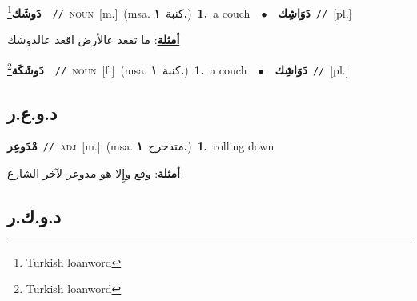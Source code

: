 \documentclass[10pt,a4paper,twoside]{article} %
\begin{document}
\begin{multicols}{2}
{\setlength\topsep{0pt}\textbf{\foreignlanguage{arabic}{دَوشَك}}\footnote{Turkish loanword}\ \ {\color{gray}\texttt{//}\color{black}}\ \textsc{noun}\ [m.]\ \color{gray}(msa. \foreignlanguage{arabic}{كنبة}~\foreignlanguage{arabic}{\textbf{١.}})\color{black}\ \textbf{1.}~a couch\ \ $\bullet$\ \ \setlength\topsep{0pt}\textbf{\foreignlanguage{arabic}{دَوَاشِك}}\ {\color{gray}\texttt{//}\color{black}}\ [pl.]\  \begin{flushright}\color{gray}\foreignlanguage{arabic}{\textbf{\underline{\foreignlanguage{arabic}{أمثلة}}}: ما تقعد عالأرض اقعد عالدوشك}\end{flushright}\color{black}} \vspace{2mm}

{\setlength\topsep{0pt}\textbf{\foreignlanguage{arabic}{دَوشَكَة}}\footnote{Turkish loanword}\ \ {\color{gray}\texttt{//}\color{black}}\ \textsc{noun}\ [f.]\ \color{gray}(msa. \foreignlanguage{arabic}{كنبة}~\foreignlanguage{arabic}{\textbf{١.}})\color{black}\ \textbf{1.}~a couch\ \ $\bullet$\ \ \setlength\topsep{0pt}\textbf{\foreignlanguage{arabic}{دَوَاشِك}}\ {\color{gray}\texttt{//}\color{black}}\ [pl.]\ } \vspace{2mm}

\vspace{-3mm}
\subsection*{\color{blue}\foreignlanguage{arabic}{د.و.ع.ر}\color{blue}{}} 

{\setlength\topsep{0pt}\textbf{\foreignlanguage{arabic}{مْدَوعِر}}\ {\color{gray}\texttt{//}\color{black}}\ \textsc{adj}\ [m.]\ \color{gray}(msa. \foreignlanguage{arabic}{متدحرج}~\foreignlanguage{arabic}{\textbf{١.}})\color{black}\ \textbf{1.}~rolling down\  \begin{flushright}\color{gray}\foreignlanguage{arabic}{\textbf{\underline{\foreignlanguage{arabic}{أمثلة}}}: وقع وإِلا هو مدوعر لآخر الشارع}\end{flushright}\color{black}} \vspace{2mm}

\vspace{-3mm}
\subsection*{\color{blue}\foreignlanguage{arabic}{د.و.ك.ر}\color{blue}{}} 


\end{multicols}
\end{document}
